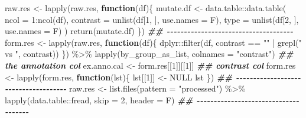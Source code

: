 \documentclass[
]{article}
\newenvironment{Shaded}{\begin{snugshade}}{\end{snugshade}}
\newcommand{\AttributeTok}[1]{\textcolor[rgb]{0.77,0.63,0.00}{#1}}
\newcommand{\ConstantTok}[1]{\textcolor[rgb]{0.00,0.00,0.00}{#1}}
\newcommand{\ControlFlowTok}[1]{\textcolor[rgb]{0.13,0.29,0.53}{\textbf{#1}}}
\newcommand{\DecValTok}[1]{\textcolor[rgb]{0.00,0.00,0.81}{#1}}
\newcommand{\DocumentationTok}[1]{\textcolor[rgb]{0.56,0.35,0.01}{\textbf{\textit{#1}}}}
\newcommand{\FunctionTok}[1]{\textcolor[rgb]{0.00,0.00,0.00}{#1}}
\newcommand{\NormalTok}[1]{#1}
\newcommand{\OtherTok}[1]{\textcolor[rgb]{0.56,0.35,0.01}{#1}}
\newcommand{\SpecialCharTok}[1]{\textcolor[rgb]{0.00,0.00,0.00}{#1}}
\newcommand{\StringTok}[1]{\textcolor[rgb]{0.31,0.60,0.02}{#1}}
\begin{document}
\begin{Shaded}
\begin{Highlighting}[]
\NormalTok{raw.res }\OtherTok{\textless{}{-}} \FunctionTok{lapply}\NormalTok{(raw.res, }\ControlFlowTok{function}\NormalTok{(df)\{}
\NormalTok{                    mutate.df }\OtherTok{\textless{}{-}}\NormalTok{ data.table}\SpecialCharTok{::}\FunctionTok{data.table}\NormalTok{(}
                      \AttributeTok{ncol =} \DecValTok{1}\SpecialCharTok{:}\FunctionTok{ncol}\NormalTok{(df),}
                      \AttributeTok{contrast =} \FunctionTok{unlist}\NormalTok{(df[}\DecValTok{1}\NormalTok{, ], }\AttributeTok{use.names =}\NormalTok{ F),}
                      \AttributeTok{type =} \FunctionTok{unlist}\NormalTok{(df[}\DecValTok{2}\NormalTok{, ], }\AttributeTok{use.names =}\NormalTok{ F)}
\NormalTok{                    )}
                    \FunctionTok{return}\NormalTok{(mutate.df)}
\NormalTok{\})}
\DocumentationTok{\#\# {-}{-}{-}{-}{-}{-}{-}{-}{-}{-}{-}{-}{-}{-}{-}{-}{-}{-}{-}{-}{-}{-}{-}{-}{-}{-}{-}{-}{-}{-}{-}{-}{-}{-}{-}{-}{-} }
\NormalTok{form.res }\OtherTok{\textless{}{-}} \FunctionTok{lapply}\NormalTok{(raw.res, }\ControlFlowTok{function}\NormalTok{(df)\{}
\NormalTok{                     dplyr}\SpecialCharTok{::}\FunctionTok{filter}\NormalTok{(df, contrast }\SpecialCharTok{==} \StringTok{""} \SpecialCharTok{|} \FunctionTok{grepl}\NormalTok{(}\StringTok{" vs "}\NormalTok{, contrast))}
\NormalTok{\}) }\SpecialCharTok{\%\textgreater{}\%} 
  \FunctionTok{lapply}\NormalTok{(by\_group\_as\_list, }\AttributeTok{colnames =} \StringTok{"contrast"}\NormalTok{)}
\DocumentationTok{\#\# the annotation col}
\NormalTok{ex.anno.cal }\OtherTok{\textless{}{-}}\NormalTok{ form.res[[}\DecValTok{1}\NormalTok{]][[}\DecValTok{1}\NormalTok{]]}
\DocumentationTok{\#\# contrast col}
\NormalTok{form.res }\OtherTok{\textless{}{-}} \FunctionTok{lapply}\NormalTok{(form.res, }\ControlFlowTok{function}\NormalTok{(lst)\{}
\NormalTok{                     lst[[}\DecValTok{1}\NormalTok{]] }\OtherTok{\textless{}{-}} \ConstantTok{NULL}
\NormalTok{                     lst}
\NormalTok{\})}
\DocumentationTok{\#\# {-}{-}{-}{-}{-}{-}{-}{-}{-}{-}{-}{-}{-}{-}{-}{-}{-}{-}{-}{-}{-}{-}{-}{-}{-}{-}{-}{-}{-}{-}{-}{-}{-}{-}{-}{-}{-} }
\NormalTok{raw.res }\OtherTok{\textless{}{-}} \FunctionTok{list.files}\NormalTok{(}\AttributeTok{pattern =} \StringTok{"processed"}\NormalTok{) }\SpecialCharTok{\%\textgreater{}\%} 
  \FunctionTok{lapply}\NormalTok{(data.table}\SpecialCharTok{::}\NormalTok{fread, }\AttributeTok{skip =} \DecValTok{2}\NormalTok{, }\AttributeTok{header =}\NormalTok{ F) }
\DocumentationTok{\#\# {-}{-}{-}{-}{-}{-}{-}{-}{-}{-}{-}{-}{-}{-}{-}{-}{-}{-}{-}{-}{-}{-}{-}{-}{-}{-}{-}{-}{-}{-}{-}{-}{-}{-}{-}{-}{-} }

\end{Highlighting}
\end{Shaded}
\end{document}
